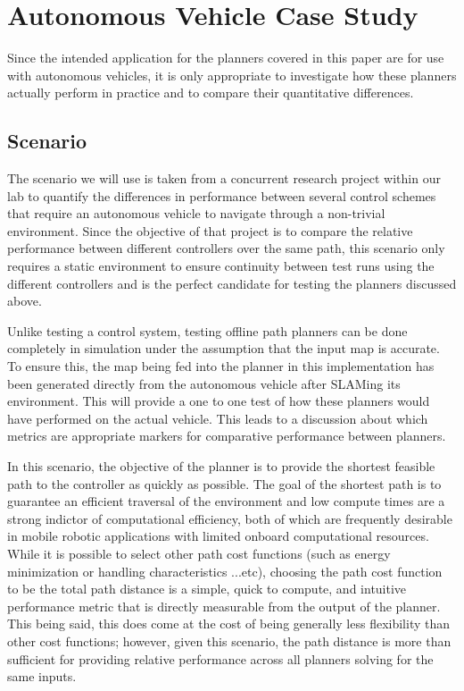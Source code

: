 \section{Autonomous Vehicle Case Study}

Since the intended application for the planners covered in this paper are for use with autonomous vehicles, it is only appropriate to investigate how these planners actually perform in practice and to compare their quantitative differences.

\subsection{Scenario}
The scenario we will use is taken from a concurrent research project within our lab to quantify the differences in performance between several control schemes that require an autonomous vehicle to navigate through a non-trivial environment. Since the objective of that project is to compare the relative performance between different controllers over the same path, this scenario only requires a static environment to ensure continuity between test runs using the different controllers and is the perfect candidate for testing the planners discussed above.

Unlike testing a control system, testing offline path planners can be done completely in simulation under the assumption that the input map is accurate. To ensure this, the map being fed into the planner in this implementation has been generated directly from the autonomous vehicle after SLAMing its environment. This will provide a one to one test of how these planners would have performed on the actual vehicle. This leads to a discussion about which metrics are appropriate markers for comparative performance between planners. 

In this scenario, the objective of the planner is to provide the shortest feasible path to the controller as quickly as possible. The goal of the shortest path is to guarantee an efficient traversal of the environment and low compute times are a strong indictor of computational efficiency, both of which are frequently desirable in mobile robotic applications with limited onboard computational resources. While it is possible to select other path cost functions (such as energy minimization or handling characteristics ...etc), choosing the path cost function to be the total path distance is a simple, quick to compute, and intuitive performance metric that is directly measurable from the output of the planner. This being said, this does come at the cost of being generally less flexibility than other cost functions; however, given this scenario, the path distance is more than sufficient for providing relative performance across all planners solving for the same inputs.  


